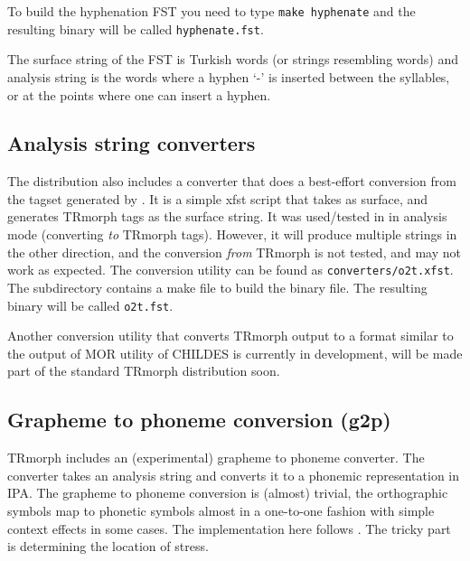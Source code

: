\documentclass[twocolumn]{article}
\begin{document}
To build the hyphenation FST you need to type 
\lstinline{make hyphenate} and the resulting binary will be called
\lstinline{hyphenate.fst}.

The surface string of the FST is Turkish words (or strings resembling
words) and analysis string is the words where a hyphen `-' is inserted
between the syllables, or at the points where one can insert a hyphen.

\subsection{Analysis string converters}

The distribution also includes a converter that does a best-effort conversion from the tagset generated by \textcite{oflazer1994}. 
It is a simple xfst script that takes \textcite{oflazer1994} as surface,
and generates TRmorph tags as the surface string.
It was used/tested in in analysis mode (converting \emph{to} TRmorph tags).
However, it will produce multiple strings in the other direction,
and the conversion \emph{from} TRmorph is not tested, and may not work as expected.
The conversion utility can be found as \lstinline{converters/o2t.xfst}.
The subdirectory contains a make file to build the binary file.
The resulting binary will be called \lstinline{o2t.fst}.

Another conversion utility that converts TRmorph output to a format similar to the output of MOR utility of CHILDES \parencite{macwhinney1985,macwhinney1990} is currently in development,
will be made part of the standard TRmorph distribution soon.

\subsection{Grapheme to phoneme conversion (g2p)}

TRmorph includes an (experimental) grapheme to phoneme converter.
The converter takes an analysis string and converts it to a phonemic representation in IPA.
The grapheme to phoneme conversion is (almost) trivial, 
the orthographic symbols map to phonetic symbols almost in a one-to-one fashion with simple context effects in some cases.
The implementation here follows \textcite{goksel2005}.
The tricky part is determining the location of stress.
\end{document}
